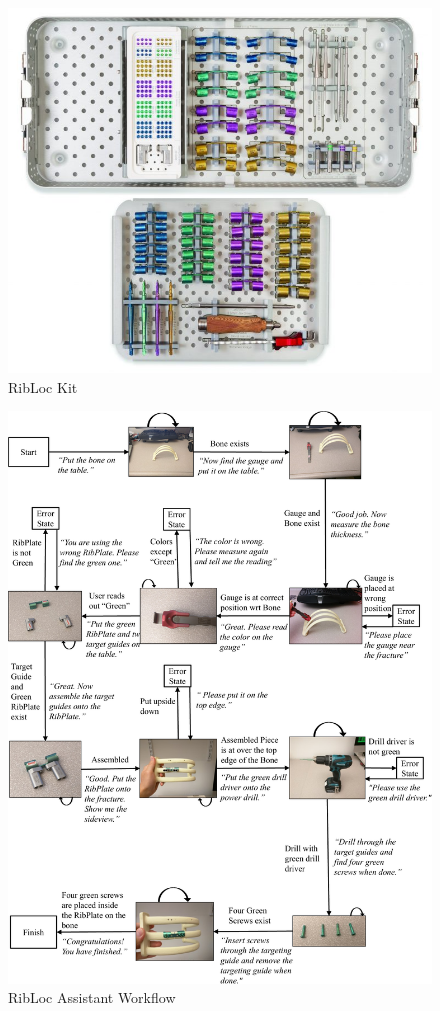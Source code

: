 

\begin{figure}
    \centering
    \includegraphics[width=0.5\linewidth]{FIGS/RibLoc.jpg}
    \caption{RibLoc Kit}
    \label{fig:ribloc}
\end{figure}

\begin{figure}
    \centering
    \includegraphics[width=\linewidth]{FIGS/ribloc-fsm-crop.pdf}
    \caption{RibLoc Assistant Workflow}
    \label{fig:ribloc-app}
\end{figure}

